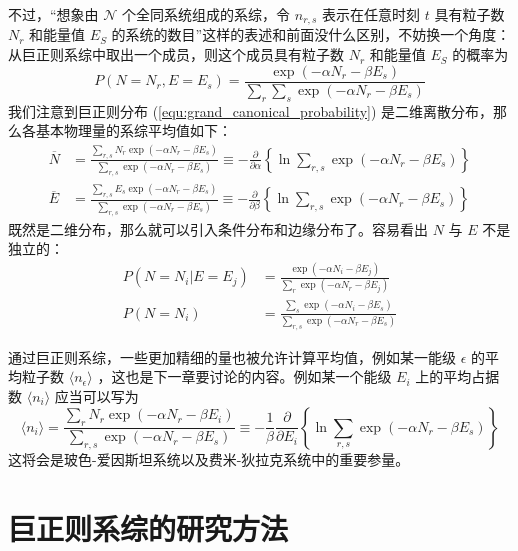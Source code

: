 不过，“想象由 $\mathscr N$ 个全同系统组成的系综，令 $n_{r, s}$ 表示在任意时刻 $t$ 具有粒子数 $N_r$ 和能量值 $E_S$ 的系统的数目”这样的表述和前面没什么区别，不妨换一个角度：从巨正则系综中取出一个成员，则这个成员具有粒子数 $N_r$ 和能量值 $E_S$ 的概率为
\begin{equation}\label{equ:grand_canonical_probability}
    P(N = N_r, E = E_s) = \frac{\exp(-\alpha N_r - \beta E_s)}{\displaystyle\sum\limits_r\sum\limits_s\exp(-\alpha N_r - \beta E_s)}
\end{equation}
我们注意到巨正则分布 (\ref*{equ:grand_canonical_probability}) 是二维离散分布，那么各基本物理量的系综平均值如下：
\begin{align}
    \overline{N} &= \frac{\displaystyle\sum_{r, s}N_r\exp(-\alpha N_r - \beta E_s)}{\displaystyle\sum_{r, s}\exp(-\alpha N_r - \beta E_s)}\equiv -\frac{\partial}{\partial \alpha}\left\{ \ln\sum_{r, s}\exp(-\alpha N_r - \beta E_s) \right\} \\
    \overline{E} &=  \frac{\displaystyle\sum_{r, s}E_s\exp(-\alpha N_r - \beta E_s)}{\displaystyle\sum_{r, s}\exp(-\alpha N_r - \beta E_s)}\equiv -\frac{\partial}{\partial \beta}\left\{ \ln\sum_{r, s}\exp(-\alpha N_r - \beta E_s) \right\}
\end{align}
既然是二维分布，那么就可以引入条件分布和边缘分布了。容易看出 $N$ 与 $E$ 不是独立的：
\begin{align*}
    P(N = N_i | E = E_j) &= \frac{\exp(-\alpha N_i - \beta E_j)}{\displaystyle\sum_r\exp(-\alpha N_r - \beta E_j)} \\
    P(N = N_i) &= \frac{\displaystyle\sum_s\exp(-\alpha N_i - \beta E_s)}{\displaystyle\sum_{r,s}\exp(-\alpha N_r - \beta E_s)}
\end{align*}

通过巨正则系综，一些更加精细的量也被允许计算平均值，例如某一能级 $\epsilon$ 的平均粒子数 $\langle n_\epsilon \rangle$ ，这也是下一章要讨论的内容。例如某一个能级 $E_i$ 上的平均占据数 $\langle n_i\rangle$ 应当可以写为
\begin{equation}\label{equ:n_epsilon}
    \langle n_i\rangle = \frac{\displaystyle\sum_{r}N_r\exp(-\alpha N_r - \beta E_i)}{\displaystyle\sum_{r, s}\exp(-\alpha N_r - \beta E_s)}\equiv -\frac{1}{\beta} \frac{\partial}{\partial E_i}\left\{ \ln\sum_{r, s}\exp(-\alpha N_r - \beta E_s) \right\}
\end{equation}
这将会是玻色-爱因斯坦系统以及费米-狄拉克系统中的重要参量。

\section{巨正则系综的研究方法}\label{sec:巨正则系综的研究方法}






